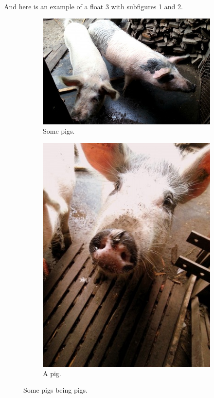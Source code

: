 
And here is an example of a float \ref{fig:subex} with subfigures
\ref{fig:subex:pigs} and \ref{fig:subex:pig}.

\begin{figure}[!ht]
  \centering
  \begin{subfigure}[b]{0.3\textwidth}
    \includegraphics[width=\textwidth]{static/img/pigs1.jpg}
    \caption{Some pigs.}
    \label{fig:subex:pigs}
  \end{subfigure}
  \begin{subfigure}[b]{0.3\textwidth}
    \includegraphics[width=\textwidth]{static/img/pigs2.jpg}
    \caption{A pig.}
    \label{fig:subex:pig}
  \end{subfigure}
  \caption{Some pigs being pigs.}
  \label{fig:subex}
\end{figure}

